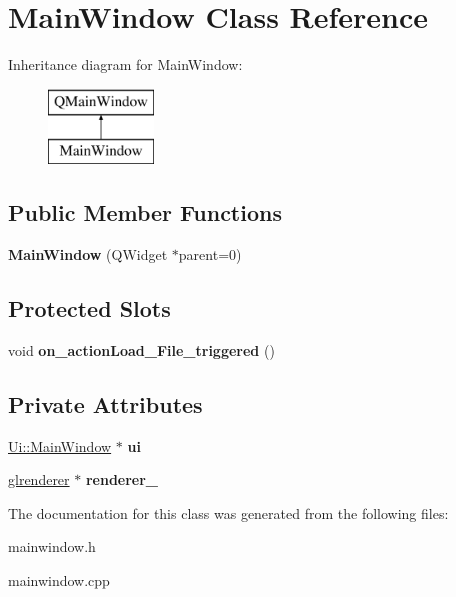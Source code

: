 \hypertarget{class_main_window}{\section{Main\+Window Class Reference}
\label{class_main_window}
}
Inheritance diagram for Main\+Window\+:\begin{figure}[H]
\begin{center}
\leavevmode
\includegraphics[height=2.000000cm]{class_main_window}
\end{center}
\end{figure}
\subsection*{Public Member Functions}
\begin{DoxyCompactItemize}
\item 
\hypertarget{class_main_window_a8b244be8b7b7db1b08de2a2acb9409db}{{\bfseries Main\+Window} (Q\+Widget $\ast$parent=0)}\label{class_main_window_a8b244be8b7b7db1b08de2a2acb9409db}

\end{DoxyCompactItemize}
\subsection*{Protected Slots}
\begin{DoxyCompactItemize}
\item 
\hypertarget{class_main_window_aa146e796f9a0cfeb05c1ef31a81c6f75}{void {\bfseries on\+\_\+action\+Load\+\_\+\+File\+\_\+triggered} ()}\label{class_main_window_aa146e796f9a0cfeb05c1ef31a81c6f75}

\end{DoxyCompactItemize}
\subsection*{Private Attributes}
\begin{DoxyCompactItemize}
\item 
\hypertarget{class_main_window_a35466a70ed47252a0191168126a352a5}{\hyperlink{class_ui_1_1_main_window}{Ui\+::\+Main\+Window} $\ast$ {\bfseries ui}}\label{class_main_window_a35466a70ed47252a0191168126a352a5}

\item 
\hypertarget{class_main_window_ac7f41407e2c50b7d62e17b7e960ff5d9}{\hyperlink{classglrenderer}{glrenderer} $\ast$ {\bfseries renderer\+\_\+}}\label{class_main_window_ac7f41407e2c50b7d62e17b7e960ff5d9}

\end{DoxyCompactItemize}


The documentation for this class was generated from the following files\+:\begin{DoxyCompactItemize}
\item 
mainwindow.\+h\item 
mainwindow.\+cpp\end{DoxyCompactItemize}
